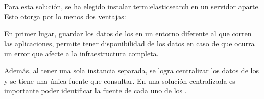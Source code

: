 Para esta solución, se ha elegido instalar \gls{term:elasticsearch} en un
servidor aparte. Esto otorga por lo menos dos ventajas:

En primer lugar, guardar los datos de los  en un entorno diferente al
que corren las aplicaciones, permite tener disponibilidad de los datos en
caso de que ocurra un error que afecte a la infraestructura completa.

Además, al tener una sola instancia separada, se logra centralizar los datos de
los  y se tiene una única fuente que consultar. En una solución
centralizada es importante poder identificar la fuente de cada uno de los
.
